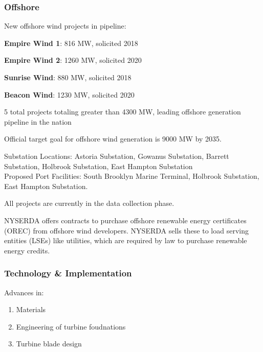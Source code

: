 \documentclass[plain]{article}
\newcommand{\1}{\mathbbm{1}}
\begin{document}
\subsubsection{Offshore}
New offshore wind projects in pipeline:
\begin{tightlist}
	\item \textbf{Empire Wind 1}: 816 MW, solicited 2018 \cite{noauthor_new_nodate-1}
	\item \textbf{Empire Wind 2}: 1260 MW, solicited 2020 \cite{noauthor_new_nodate-1}
	\item \textbf{Sunrise Wind}: 880 MW, solicited 2018 \cite{noauthor_new_nodate-1}
	\item \textbf{Beacon Wind}: 1230 MW, solicited 2020 \cite{noauthor_new_nodate-1}
\end{tightlist}

5 total projects totaling greater than 4300 MW, leading offshore generation pipeline in the nation

Official target goal for offshore wind generation is 9000 MW by 2035. \cite{noauthor_us_nodate-1}

Substation Locations: Astoria Substation, Gowanus Substation, Barrett Substation, Holbrook Substation, East Hampton Substation\\
Proposed Port Facilities: South Brooklyn Marine Terminal, Holbrook Substation, East Hampton Substation. \cite{noauthor_new_nodate-1}

All projects are currently in the data collection phase. \cite{noauthor_new_nodate-1}

NYSERDA offers contracts to purchase offshore renewable energy certificates (OREC) from offshore wind developers. NYSERDA sells these to load serving entities (LSEs) like utilities, which are required by law to purchase renewable energy credits. \cite{NYSERDA_new_nodate-1}

\subsubsection{Technology \& Implementation}
Advances in:
\begin{enumerate}
	\item Materials
	\item Engineering of turbine foudnations
	\item Turbine blade design
\end{enumerate}
\end{document}
